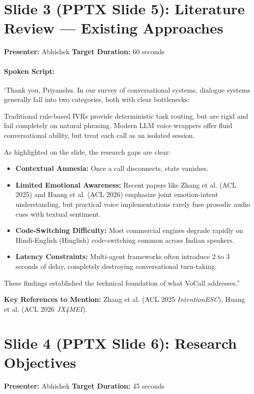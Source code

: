 \documentclass[11pt,a4paper]{article}
\begin{document}
\newpage

\section*{Slide 3 (PPTX Slide 5): Literature Review — Existing Approaches}
\textbf{Presenter:} Abhishek \hfill \textbf{Target Duration:} 60 seconds

\paragraph{Spoken Script:}
`Thank you, Priyanshu. In our survey of conversational systems, dialogue systems generally fall into two categories, both with clear bottlenecks:

Traditional rule-based IVRs provide deterministic task routing, but are rigid and fail completely on natural phrasing. Modern LLM voice wrappers offer fluid conversational ability, but treat each call as an isolated session.

As highlighted on the slide, the research gaps are clear:
\begin{itemize}
    \item \textbf{Contextual Amnesia:} Once a call disconnects, state vanishes.
    \item \textbf{Limited Emotional Awareness:} Recent papers like Zhang et al. (ACL 2025) and Huang et al. (ACL 2026) emphasize joint emotion-intent understanding, but practical voice implementations rarely fuse prosodic audio cues with textual sentiment.
    \item \textbf{Code-Switching Difficulty:} Most commercial engines degrade rapidly on Hindi-English (Hinglish) code-switching common across Indian speakers.
    \item \textbf{Latency Constraints:} Multi-agent frameworks often introduce 2 to 3 seconds of delay, completely destroying conversational turn-taking.
\end{itemize}
These findings established the technical foundation of what VoCall addresses.''

\noindent\textbf{Key References to Mention:} Zhang et al. (ACL 2025 \textit{IntentionESC}), Huang et al. (ACL 2026 \textit{JX4MEI}).

\vspace{1.5em}

\section*{Slide 4 (PPTX Slide 6): Research Objectives}
\textbf{Presenter:} Abhishek \hfill \textbf{Target Duration:} 45 seconds
\end{document}
